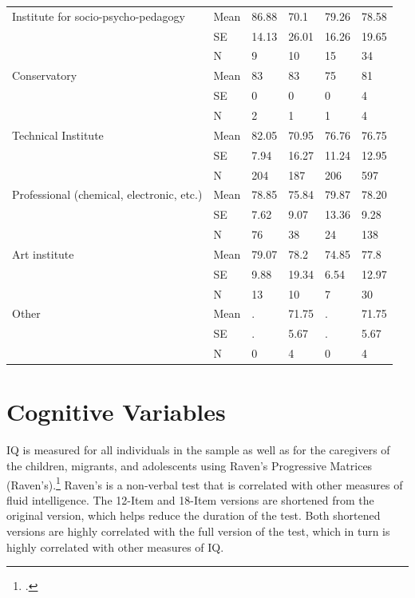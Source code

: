 \begin{table}[H]
\begin{tabular}{L{3.5cm} L{1.5cm} L{2cm} L{2cm} L{2cm} | L{2cm}}
 Institute for socio-psycho-pedagogy & Mean & 86.88 &      70.1 & 79.26 & 78.58 \\
          & SE & 14.13 &   26.01  & 16.26 & 19.65 \\
          & N &    9  &       10   &      15 &        34 \\ 

 Conservatory & Mean &        83      &   83   &      75 &        81 \\
          & SE &         0       &   0    &      0 &         4 \\
           & N &         2        &  1     &     1 &         4 \\ 

 Technical Institute & Mean & 82.05 &  70.95 &  76.76 & 76.75 \\
          & SE & 7.94 & 16.27 &  11.24 &  12.95  \\
           & N &       204 &       187 &       206 &       597 \\ 

 Professional (chemical, electronic, etc.) & Mean & 78.85 & 75.84 &    79.87 & 78.20 \\
          & SE & 7.62 & 9.07 &  13.36 & 9.28 \\
           & N &        76 &        38 &        24 &       138 \\ 

 Art institute & Mean & 79.07 &      78.2 & 74.85 &      77.8 \\
          & SE & 9.88 & 19.34 & 6.54 &  12.97 \\
          & N &        13 &        10 &         7 &        30 \\ 

       Other & Mean &         . &     71.75 &         . &     71.75 \\
          & SE &         . & 5.67 &         . & 5.67 \\
          & N &         0 &         4 &         0 &         4 \\ \bottomrule

\end{tabular}
\end{table}


\section{Cognitive Variables}
\label{sec:cog}

IQ is measured for all individuals in the sample as well as for the caregivers of the children, migrants, and adolescents using Raven's Progressive Matrices (Raven's).\footnote{\citet{Raven_Raven_etal_1988_BOOKManualRavensprogressive}.} Raven's is a non-verbal test that is correlated with other measures of fluid intelligence. The 12-Item and 18-Item versions are shortened from the original version, which helps reduce the duration of the test. Both shortened versions are highly correlated with the full version of the test, which in turn is highly correlated with other measures of IQ.

